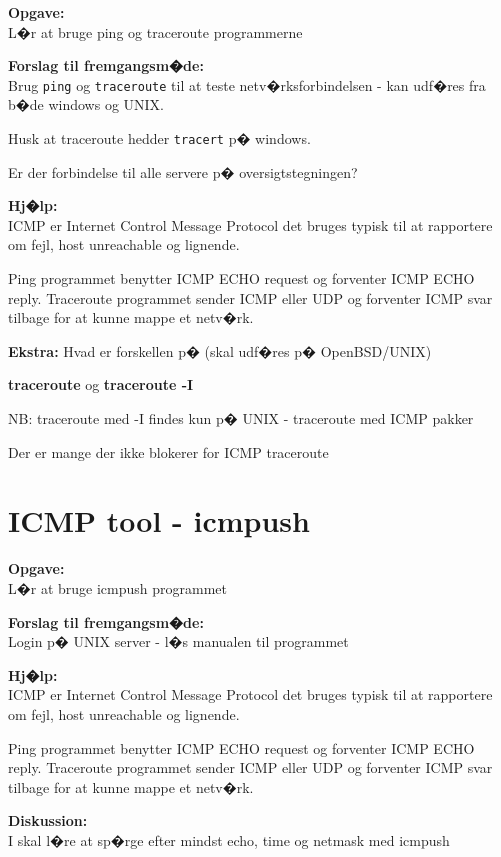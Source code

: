 \documentclass[a4paper,11pt,notitlepage]{oevelser}
\begin{document}
{\bfseries Opgave:}\\
L�r at bruge ping og traceroute programmerne

{\bfseries Forslag til fremgangsm�de:} \\
Brug \verb+ping+ og \verb+traceroute+ til at teste netv�rksforbindelsen - kan
udf�res fra b�de windows og UNIX.

Husk at traceroute hedder \verb+tracert+ p� windows.

Er der forbindelse til alle servere p� oversigtstegningen?

{\bfseries Hj�lp:} \\
ICMP er Internet Control Message Protocol det bruges typisk til at
rapportere om fejl, host unreachable og lignende.

Ping programmet benytter ICMP ECHO request og forventer ICMP ECHO
reply. Traceroute programmet sender ICMP eller UDP og forventer ICMP
svar tilbage for at kunne mappe et netv�rk.

{\bf Ekstra:}
Hvad er forskellen p� (skal udf�res p� OpenBSD/UNIX)
\begin{list2}
\item {\bfseries traceroute} og {\bfseries traceroute -I}
\item NB: traceroute med -I findes kun p� UNIX - traceroute med ICMP pakker
\item Der er mange der ikke blokerer for ICMP traceroute
\end{list2}

\chapter{ICMP tool - icmpush}
\label{ex:icmpush}

{\bfseries Opgave:} \\
L�r at bruge icmpush programmet

{\bfseries Forslag til fremgangsm�de:} \\
Login p� UNIX server - l�s manualen til programmet

{\bfseries Hj�lp:} \\
ICMP er Internet Control Message Protocol det bruges typisk til at
rapportere om fejl, host unreachable og lignende.

Ping programmet benytter ICMP ECHO request og forventer ICMP ECHO
reply. Traceroute programmet sender ICMP eller UDP og forventer ICMP
svar tilbage for at kunne mappe et netv�rk.

{\bfseries Diskussion:}\\
I skal l�re at sp�rge efter mindst echo, time og netmask med icmpush
\end{document}
